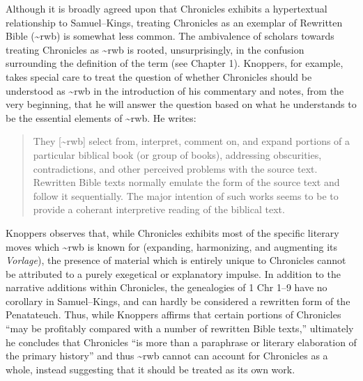 Although it is broadly agreed upon that Chronicles exhibits a
hypertextual relationship to Samuel--Kings, treating Chronicles as an
exemplar of Rewritten Bible (\textasciitilde{}rwb) is somewhat less
common.\autocites[Though, not particularly
\emph{un}common:][]{campbell_zsengeller2014}{zahn_lim-collins2010}{bernstein_textus2005}[Alexander
considers Chronicles to be a ``prototype'' of \textasciitilde{}rwb,
see][100]{alexander_carson-williamson1988}[I have adopted the
terminology of hyper-/hypotext from Genette. In this case, to say that
Chronicles is a ``hypertext'' of Samuel--Kings is to say that it is
derivative, but not a commentary on Samuel--Kings. See][5]{genette1997}
The ambivalence of scholars towards treating Chronicles as
\textasciitilde{}rwb is rooted, unsurprisingly, in the confusion
surrounding the definition of the term (see Chapter 1). Knoppers, for
example, takes special care to treat the question of whether Chronicles
should be understood as \textasciitilde{}rwb in the introduction of his
commentary and notes, from the very beginning, that he will answer the
question based on what he understands to be the essential elements of
\textasciitilde{}rwb.\autocite[ , 129--134]{knoppers2003} He writes:

\begin{quote}
They {[}\textasciitilde{}rwb{]} select from, interpret, comment on, and
expand portions of a particular biblical book (or group of books),
addressing obscurities, contradictions, and other perceived problems
with the source text. Rewritten Bible texts normally emulate the form of
the source text and follow it sequentially. The major intention of such
works seems to be to provide a coherant interpretive reading of the
biblical text.\autocite[130]{knoppers2003}
\end{quote}

Knoppers observes that, while Chronicles exhibits most of the specific
literary moves which \textasciitilde{}rwb is known for (expanding,
harmonizing, and augmenting its \emph{Vorlage}), the presence of
material which is entirely unique to Chronicles cannot be attributed to
a purely exegetical or explanatory impulse. In addition to the narrative
additions within Chronicles, the genealogies of 1 Chr 1--9 have no
corollary in Samuel--Kings, and can hardly be considered a rewritten
form of the Penatateuch.\autocite[132]{knoppers2003} Thus, while
Knoppers affirms that certain portions of Chronicles ``may be profitably
compared with a number of rewritten Bible
texts,''\autocite[131]{knoppers2003} ultimately he concludes that
Chronicles ``is more than a paraphrase or literary elaboration of the
primary history''\autocite[134]{knoppers2003} and thus
\textasciitilde{}rwb cannot can account for Chronicles as a whole,
instead suggesting that it should be treated as its own
work.\autocite[131--134]{knoppers2003}

